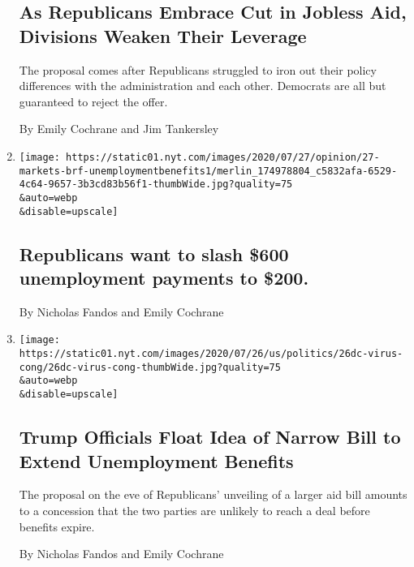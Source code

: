 \begin{enumerate}
  \hypertarget{as-republicans-embrace-cut-in-jobless-aid-divisions-weaken-their-leverage}{%
  \subsection{As Republicans Embrace Cut in Jobless Aid, Divisions
  Weaken Their
  Leverage}\label{as-republicans-embrace-cut-in-jobless-aid-divisions-weaken-their-leverage}}

  The proposal comes after Republicans struggled to iron out their
  policy differences with the administration and each other. Democrats
  are all but guaranteed to reject the offer.

  By Emily Cochrane and Jim Tankersley
\item
  \href{/live/2020/07/27/business/stock-market-today-coronavirus/republicans-want-to-slash-600-unemployment-payments-to-200}{}

  \texttt{[image: https://static01.nyt.com/images/2020/07/27/opinion/27-markets-brf-unemploymentbenefits1/merlin\_174978804\_c5832afa-6529-4c64-9657-3b3cd83b56f1-thumbWide.jpg?quality=75\\\&auto=webp\\\&disable=upscale]}

  \hypertarget{republicans-want-to-slash-600-unemployment-payments-to-200}{%
  \subsection{Republicans want to slash \$600 unemployment payments to
  \$200.}\label{republicans-want-to-slash-600-unemployment-payments-to-200}}

  By Nicholas Fandos and Emily Cochrane
\item
  \href{/2020/07/26/us/politics/coronavirus-stimulus-bill-unemployment.html}{}

  \texttt{[image: https://static01.nyt.com/images/2020/07/26/us/politics/26dc-virus-cong/26dc-virus-cong-thumbWide.jpg?quality=75\\\&auto=webp\\\&disable=upscale]}

  \hypertarget{trump-officials-float-idea-of-narrow-bill-to-extend-unemployment-benefits}{%
  \subsection{Trump Officials Float Idea of Narrow Bill to Extend
  Unemployment
  Benefits}\label{trump-officials-float-idea-of-narrow-bill-to-extend-unemployment-benefits}}

  The proposal on the eve of Republicans' unveiling of a larger aid bill
  amounts to a concession that the two parties are unlikely to reach a
  deal before benefits expire.

  By Nicholas Fandos and Emily Cochrane
\end{enumerate}

